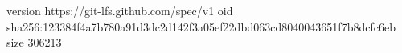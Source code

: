version https://git-lfs.github.com/spec/v1
oid sha256:123384f4a7b780a91d3dc2d142f3a05ef22dbd063cd8040043651f7b8dcfc6eb
size 306213
